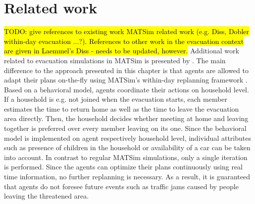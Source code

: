 \section{Related work}
\hl{TODO: give references to existing work MATSim related work (e.g.  Diss, Dobler within-day evacuation ...?).
References to other work in the evacuation context are given in Laemmel's Diss - needs to be updated, however.}
Additional work related to evacuation simulations in MATSim is presented by \citet{Dobler_PhDThesis_2013}. The main difference to the approach presented in this chapter is that agents are allowed to adapt their plans on-the-fly using MATSim's within-day replanning framework \citep{DoblerEtAl_TRR_2012}. 
Based on a behavioral model, agents coordinate their actions on household level. If a household is e.g. not joined when the evacuation starts, each member estimates the time to return home as well as the time to leave the evacuation area directly. Then, the household decides whether meeting at home and leaving together is preferred over every member leaving on its one.
Since the behavioral model is implemented on agent respectively household level, individual attributes such as presence of children in the household or availability of a car can be taken into account.
In contrast to regular MATSim simulations, only a single iteration is performed. Since the agents can optimize their plans continuously using real time information, no further replanning is necessary. As a result, it is guaranteed that agents do not foresee future events such as traffic jams caused by people leaving the threatened area.



